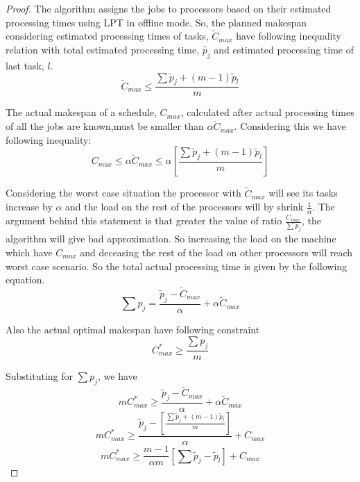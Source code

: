 \documentclass[10pt, conference, compsocconf]{IEEEtran}
\begin{document}
\begin{proof}
The algorithm assigns the jobs to processors based on their estimated processing times using LPT in offline mode. So, the planned makespan considering estimated processing times of tasks, $\tilde{C}_{max}$ have following inequality relation with total estimated processing time, $\tilde{p_j}$ and estimated processing time of last task, $l$. 
\begin{equation}
\tilde C_{max}\leq  \frac{\sum{\tilde p_j + (m-1) \tilde p_l} }{m}
\end{equation}

The actual makespan of a schedule, $C_{max}$, calculated after actual processing times of all the jobs are known,must be smaller than $\alpha\tilde C_{max}$. Considering this we have following inequality:
\begin{equation}
 C_{max}\leq \alpha \tilde C_{max}\leq \alpha [\frac{\sum{\tilde p_j + (m-1) \tilde p_l} }{m}] 
\end{equation} 

Considering the worst case situation the processor with $\tilde C_{max}$ will see its tasks increase by $\alpha$  and the load on the  rest of the processors will by shrink  $\frac{1}{\alpha}$.  The argument behind this statement is that greater the value of ratio $\frac{C_{max}}{\sum{p_j}}$, the algorithm will give bad approximation. So increasing the load on the machine which have $C_{max} $ and deceasing the rest of the load on other processors will reach worst case scenario. So the total actual processing time is given by the  following equation.
 \begin{equation}
 \sum {p_j} = \frac{\tilde p_j- \tilde C_{max}}{\alpha} + \alpha \tilde C_{max}
 \end{equation}
 
 Also the actual optimal makespan have following constraint
 \begin{equation}\nonumber 
C_{max}^{*}\geq \frac{\sum {p_j}}{m}
\end{equation}

Substituting for  $ \sum {p_j}$, we have
 \begin{equation}\nonumber 
 m C_{max}^{*}\geq \frac{\tilde p_j- \tilde C_{max}}{\alpha} + \alpha \tilde C_{max}
 \end{equation} 
\begin{equation}\nonumber 
 m C_{max}^{*}\geq \frac{\tilde p_j-[\frac{\sum{\tilde p_j + (m-1) \tilde p_l }}{m}]} {\alpha} + {C_{max}}
\end{equation}
\begin{equation}\nonumber
 m C_{max}^{*}\geq \frac{m-1}{\alpha m} [\sum \tilde p_j-\tilde p_l] + {C_{max}}
 \end{equation}


\end{proof}
\end{document}
